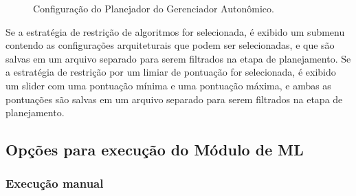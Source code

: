 \documentclass[portugues]{ic-tese}
\begin{document}
\begin{figure}[H]
    \centering
    \caption{Configuração do Planejador do Gerenciador Autonômico.}
    \label{fig:configPlanejamento}
\end{figure}

Se a estratégia de restrição de algoritmos for selecionada, é exibido um submenu contendo as configurações arquiteturais que podem ser selecionadas, e que são salvas em um arquivo separado para serem filtrados na etapa de planejamento. Se a estratégia de restrição por um limiar de pontuação for selecionada, é exibido um slider com uma pontuação mínima e uma pontuação máxima, e ambas as pontuações são salvas em um arquivo separado para serem filtrados na etapa de planejamento.

\subsection{Opções para execução do Módulo de ML}

\subsubsection{Execução manual}
\end{document}
